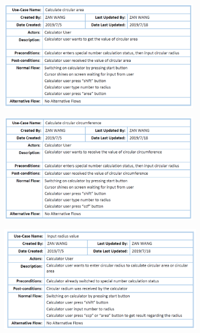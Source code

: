 \begin{figure}[H]
\centering  %
\includegraphics[width=0.9\textwidth]{images/use_case/UC_cca.PNG}
\end{figure}

\begin{figure}[H]
\centering  %
\includegraphics[width=0.9\textwidth]{images/use_case/UC_ccc.PNG}
\end{figure}

\begin{figure}[H]
\centering  %
\includegraphics[width=0.915\textwidth]{images/use_case/UC_irv.PNG}
\end{figure}

